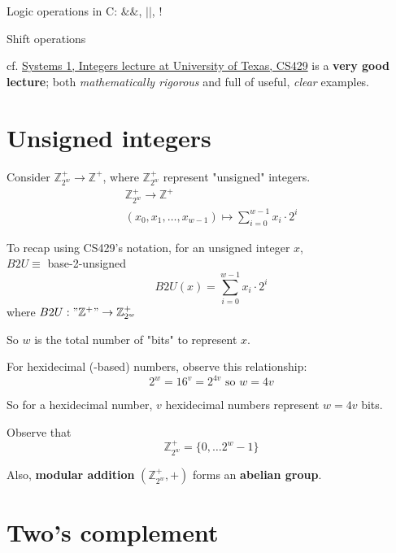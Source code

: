 \documentclass[10pt]{amsart}
\begin{document}
Logic operations in C: $\& \&$, $||$, $!$ 

Shift operations

cf. \href{https://www.cs.utexas.edu/users/fussell/courses/cs429h/lectures/Lecture_3-429h.pdf}{Systems 1, Integers lecture at University of Texas, CS429} is a \textbf{very good lecture}; both \emph{mathematically rigorous} and full of useful, \emph{clear} examples.

\section{Unsigned integers}

Consider $\mathbb{Z}^+_{2^w} \to \mathbb{Z}^+$, where $\mathbb{Z}^+_{2^w}$ represent "unsigned" integers. 
\begin{equation}
\begin{gathered}
\mathbb{Z}^+_{2^w} \to \mathbb{Z}^+ \\ 
(x_0, x_1 , \dots , x_{w-1}) \mapsto \sum_{i=0}^{w-1} x_i \cdot 2^i 
\end{gathered}
\end{equation}

To recap using CS429's notation, for an unsigned integer $x$, \\
$B2U \equiv $ base-2-unsigned \\
\[
B2U(x) = \sum_{i=0}^{w-1} x_i \cdot 2^i 
\]
where $B2U : "\mathbb{Z}^+" \to \mathbb{Z}^+_{2^w}$

So $w$ is the total number of "bits" to represent $x$.



For hexidecimal (-based) numbers, observe this relationship: 
\begin{equation}
2^w = 16^v = 2^{4v} \text{ so } w =4v
\end{equation}

So for a hexidecimal number, $v$ hexidecimal numbers represent $w=4v$ bits. 

Observe that 
\begin{equation}
\mathbb{Z}^+_{2^w} = \lbrace 0 , \dots 2^w - 1 \rbrace 
\end{equation}

Also, \textbf{modular addition} $(\mathbb{Z}^+_{2^w}, +)$ forms an \textbf{abelian group}.

\section{Two's complement}
\end{document}
